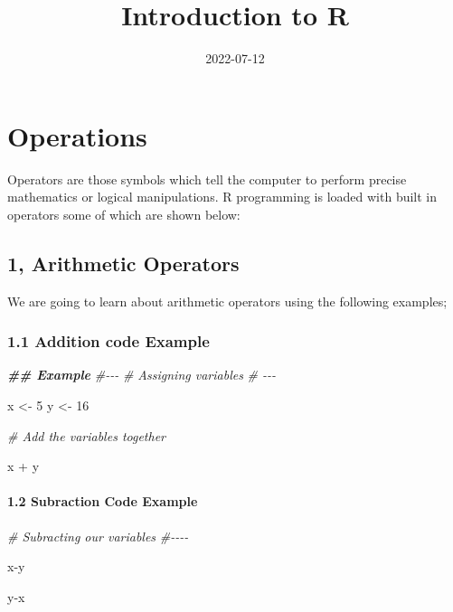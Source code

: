 \documentclass[
]{article}
\title{Introduction to R}
\author{}
\date{\vspace{-2.5em}2022-07-12}
\newenvironment{Shaded}{\begin{snugshade}}{\end{snugshade}}
\newcommand{\CommentTok}[1]{\textcolor[rgb]{0.56,0.35,0.01}{\textit{#1}}}
\newcommand{\DecValTok}[1]{\textcolor[rgb]{0.00,0.00,0.81}{#1}}
\newcommand{\DocumentationTok}[1]{\textcolor[rgb]{0.56,0.35,0.01}{\textbf{\textit{#1}}}}
\newcommand{\NormalTok}[1]{#1}
\newcommand{\OtherTok}[1]{\textcolor[rgb]{0.56,0.35,0.01}{#1}}
\newcommand{\SpecialCharTok}[1]{\textcolor[rgb]{0.00,0.00,0.00}{#1}}
\begin{document}
\maketitle

\hypertarget{operations}{%
\section{Operations}\label{operations}}

Operators are those symbols which tell the computer to perform precise
mathematics or logical manipulations. R programming is loaded with built
in operators some of which are shown below:

\hypertarget{arithmetic-operators}{%
\subsection{1, Arithmetic Operators}\label{arithmetic-operators}}

We are going to learn about arithmetic operators using the following
examples;

\hypertarget{addition-code-example}{%
\subsubsection{1.1 Addition code Example}\label{addition-code-example}}

\begin{Shaded}
\begin{Highlighting}[]
\DocumentationTok{\#\# Example}
\CommentTok{\#{-}{-}{-}}
\CommentTok{\# Assigning variables}
\CommentTok{\# {-}{-}{-}}

\NormalTok{x }\OtherTok{\textless{}{-}} \DecValTok{5}
\NormalTok{y }\OtherTok{\textless{}{-}} \DecValTok{16}


\CommentTok{\# Add the variables together}

\NormalTok{x }\SpecialCharTok{+}\NormalTok{ y}
\end{Highlighting}
\end{Shaded}

\hypertarget{subraction-code-example}{%
\paragraph{1.2 Subraction Code Example}\label{subraction-code-example}}

\begin{Shaded}
\begin{Highlighting}[]
\CommentTok{\# Subracting our variables}
\CommentTok{\#{-}{-}{-}{-}}

\NormalTok{x}\SpecialCharTok{{-}}\NormalTok{y}

\NormalTok{y}\SpecialCharTok{{-}}\NormalTok{x}
\end{Highlighting}
\end{Shaded}
\end{document}
